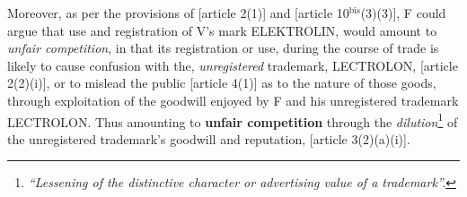\documentclass[11pt]{article}
\begin{document}
Moreover, as per the provisions of [article 2(1)]\cite{wipo96_model_provi_unfair_comp} and [article 10\(^{\text{bis}}\)(3)(3)]\cite{wipo83_paris_conve_protect_ip}, F could argue that use and registration of V's mark ELEKTROLIN, would amount to \emph{unfair competition}, in that its registration or use, during the course of trade is likely to cause confusion with the, \emph{unregistered} trademark, LECTROLON, [article 2(2)(i)]\cite{wipo96_model_provi_unfair_comp}, or to mislead the public [article 4(1)]\cite{wipo96_model_provi_unfair_comp} as to the nature of those goods, through exploitation of the goodwill enjoyed by F and his unregistered trademark LECTROLON. Thus amounting to \textbf{unfair competition} through the \emph{dilution}\footnote{\emph{``Lessening of the distinctive character or advertising value of a trademark''.}} of the unregistered trademark's goodwill and reputation, [article 3(2)(a)(i)]\cite{wipo96_model_provi_unfair_comp}.

\printbibliography
\end{document}
